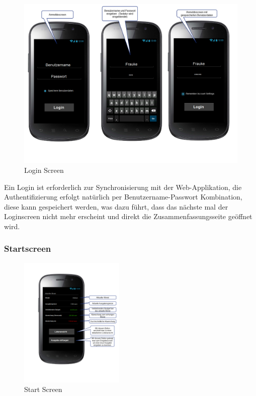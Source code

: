 \begin{figure}[htl]
\centering
\includegraphics[width=\textwidth]{img/LoginScreen}
\caption{Login Screen}
\label{fig:login_screen}
\end{figure}

Ein Login ist erforderlich zur Synchronisierung mit der Web-Applikation, die Authentifizierung erfolgt nat\"urlich per Benutzername-Passwort Kombination, diese kann gespeichert werden, was dazu führt, dass das n\"achste mal der Loginscreen nicht mehr erscheint und direkt die Zusammenfassungsseite ge\"offnet wird.

\subsubsection{Startscreen}

\begin{figure}[htl]
\centering
\includegraphics[width=5cm]{img/TitelScreen}
\caption{Start Screen}
\label{fig:start_screen}
\end{figure}

